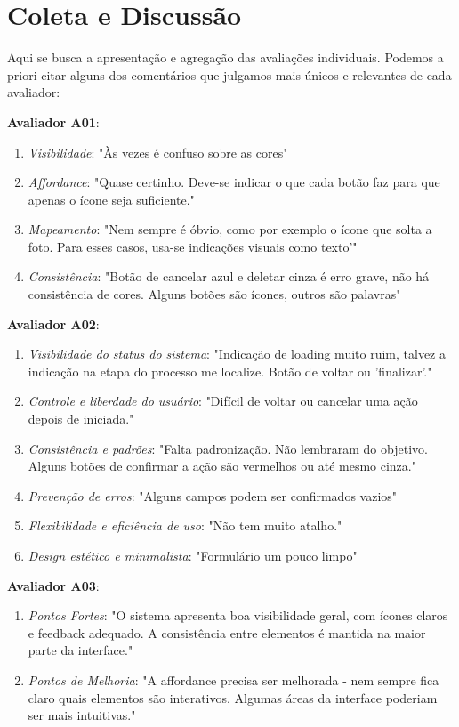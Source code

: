 

\section{Coleta e Discussão}

Aqui se busca a apresentação e agregação das avaliações individuais. Podemos a priori citar alguns dos comentários que julgamos mais únicos e relevantes de cada avaliador:

\textbf{Avaliador A01}:
\begin{enumerate}[parsep=0pt,itemsep=0pt]
    \item \textit{Visibilidade}: "Às vezes é confuso sobre as cores"
    \item \textit{Affordance}: "Quase certinho. Deve-se indicar o que cada botão faz para que apenas o ícone seja suficiente."
    \item \textit{Mapeamento}: "Nem sempre é óbvio, como por exemplo o ícone que solta a foto. Para esses casos, usa-se indicações visuais como texto'"
    \item \textit{Consistência}: "Botão de cancelar azul e deletar cinza é erro grave, não há consistência de cores. Alguns botões são ícones, outros são palavras"
\end{enumerate}

\textbf{Avaliador A02}:
\begin{enumerate}[parsep=0pt,itemsep=0pt]
    \item \textit{Visibilidade do status do sistema}: "Indicação de loading muito ruim, talvez a indicação na etapa do processo me localize. Botão de voltar ou 'finalizar'."
    \item \textit{Controle e liberdade do usuário}: "Difícil de voltar ou cancelar uma ação depois de iniciada."
    \item \textit{Consistência e padrões}: "Falta padronização. Não lembraram do objetivo. Alguns botões de confirmar a ação são vermelhos ou até mesmo cinza."
    \item \textit{Prevenção de erros}: "Alguns campos podem ser confirmados vazios"
    \item \textit{Flexibilidade e eficiência de uso}: "Não tem muito atalho."
    \item \textit{Design estético e minimalista}: "Formulário um pouco limpo"
\end{enumerate}

\textbf{Avaliador A03}:
\begin{enumerate}[parsep=0pt,itemsep=0pt]
    \item \textit{Pontos Fortes}: "O sistema apresenta boa visibilidade geral, com ícones claros e feedback adequado. A consistência entre elementos é mantida na maior parte da interface."
    \item \textit{Pontos de Melhoria}: "A affordance precisa ser melhorada - nem sempre fica claro quais elementos são interativos. Algumas áreas da interface poderiam ser mais intuitivas."
\end{enumerate}

